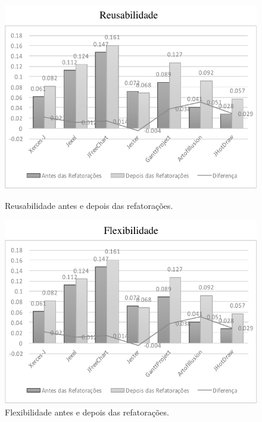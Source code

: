 \begin{figure}[!h]    
\begin{minipage}[h]{0.5\textwidth}
\includegraphics[width=\linewidth]{images/GraficoBarraExperimentoReusabilidadeNovo}
\caption{Reusabilidade antes e depois das refatorações.}
\label{fig:immediate}
\end{minipage}
\hspace{\fill}
\begin{minipage}[h]{0.5\textwidth}
\includegraphics[width=\linewidth]{images/GraficoBarraExperimentoFlexibilidadeNovo}
\caption{Flexibilidade antes e depois das refatorações.}
\label{fig:proximal}
\end{minipage}


\end{figure}

